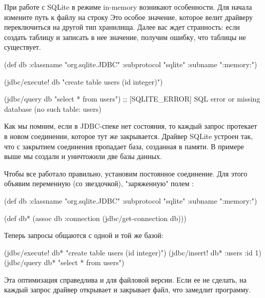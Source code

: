 При работе с SQLite в режиме in-memory возникают особенности. Для начала измените путь к файлу на строку  Это особое значение, которое велит драйверу переключиться на другой тип хранилища. Далее вас ждет странность: если создать таблицу и записать в нее значение, получим ошибку, что таблицы не существует.

\begin{english}
  \begin{clojure}
(def db
  {:classname   "org.sqlite.JDBC"
   :subprotocol "sqlite"
   :subname     ":memory:"})

(jdbc/execute! db "create table users (id integer)")

(jdbc/query db "select * from users")
;; [SQLITE_ERROR] SQL error or missing database (no such table: users)
  \end{clojure}
\end{english}

Как мы помним, если в JDBC-спеке нет состояния, то каждый запрос протекает в новом соединении, которое тут же закрывается. Драйвер SQLite устроен так, что с закрытием соединения пропадает база, созданная в памяти. В примере выше мы создали и уничтожили две базы данных.

Чтобы все работало правильно, установим постоянное соединение. Для этого объявим переменную  (со звездочкой), "заряженную" полем :

\begin{english}
  \begin{clojure}
(def db
  {:classname   "org.sqlite.JDBC"
   :subprotocol "sqlite"
   :subname     ":memory:"})

(def db*
  (assoc db :connection
         (jdbc/get-connection db)))
  \end{clojure}
\end{english}

Теперь запросы общаются с одной и той же базой:

\begin{english}
  \begin{clojure}
(jdbc/execute! db* "create table users (id integer)")
(jdbc/insert! db* :users {:id 1})
(jdbc/query db* "select * from users")
  \end{clojure}
\end{english}

Эта оптимизация справедлива и для файловой версии. Если ее не сделать, на каждый запрос драйвер открывает и закрывает файл, что замедлит программу.

